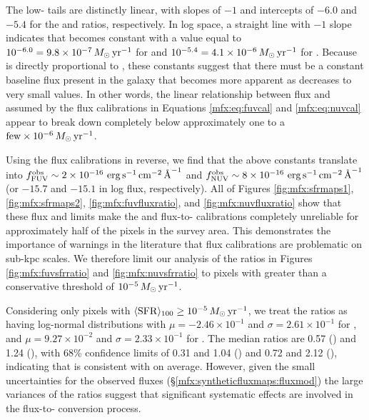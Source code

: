\documentclass[iop, tighten]{emulateapj}
\begin{document}
The low-\sfr{} tails are distinctly linear, with slopes of $-1$ and intercepts
of $-6.0$ and $-5.4$ for the \fuv{} and \nuv{} \sfr{} ratios, respectively. In
log space, a straight line with $-1$ slope indicates that \sfrx{} becomes
constant with a value equal to $10^{-6.0} = 9.8\times 10^{-7}\,M_\odot\,\mathrm{yr}^{-1}$ for
\fuv{} and $10^{-5.4} = 4.1\times 10^{-6}\,M_\odot\,\mathrm{yr}^{-1}$ for \nuv{}. Because
\sfrx{} is directly proportional to \fxobs{}, these \sfr{} constants suggest
that there must be a constant baseline flux present in the galaxy that becomes
more apparent as \sfroneh{} decreases to very small values. In other words, the
linear relationship between flux and \sfr{} assumed by the flux calibrations in
Equations \ref{mfx:eq:fuvcal} and \ref{mfx:eq:nuvcal} appear to break down
completely below \sfroneh{} approximately one to a $\mathrm{few} \times
10^{-6}\,M_\odot\,\mathrm{yr}^{-1}$.

Using the flux calibrations in reverse, we find that the above \sfr{} constants
translate into $f_{\mathrm{FUV}}^{\mathrm{obs}} \sim 2\times 10^{-16}\, \,\mathrm{erg}\,\mathrm{s}^{-1}\,\mathrm{cm}^{-2}\,\textrm{\AA}^{-1}$ and $f_{\mathrm{NUV}}^{\mathrm{obs}} \sim
8\times 10^{-16}\, \,\mathrm{erg}\,\mathrm{s}^{-1}\,\mathrm{cm}^{-2}\,\textrm{\AA}^{-1}$ (or $-15.7$ and $-15.1$ in log flux, respectively).
All of Figures  \ref{fig:mfx:sfrmaps1}, \ref{fig:mfx:sfrmaps2},
\ref{fig:mfx:fuvfluxratio}, and \ref{fig:mfx:nuvfluxratio} show that these flux
and \sfr{} limits make the \fuv{} and \nuv{} flux-to-\sfr{} calibrations
completely unreliable for approximately half of the pixels in the survey area.
This demonstrates the importance of warnings in the literature
\citep[e.g.,][]{Murphy:2011,Kennicutt:2012,Leroy:2012} that flux calibrations
are problematic on sub-kpc scales. We therefore limit our analysis of the
\sfr{} ratios in Figures \ref{fig:mfx:fuvsfrratio} and
\ref{fig:mfx:nuvsfrratio} to pixels with \sfroneh{} greater than a conservative
threshold of $10^{-5}\,M_\odot\,\mathrm{yr}^{-1}$.

Considering only pixels with $\langle\mathrm{SFR}\rangle_{100} \ge 10^{-5}\,M_\odot\,\mathrm{yr}^{-1}$, we treat the
\sfr{} ratios as having log-normal distributions with $\mu = -2.46\times
10^{-1}$ and $\sigma = 2.61\times 10^{-1}$ for \fuv{}, and $\mu = 9.27\times
10^{-2}$ and $\sigma = 2.33\times 10^{-1}$ for \nuv{}. The median ratios are
0.57 (\fuv{}) and 1.24 (\nuv{}), with 68\% confidence limits of 0.31 and 1.04
(\fuv{}) and 0.72 and 2.12 (\nuv{}), indicating that \sfrx{} is consistent with
\sfroneh{} on average. However, given the small uncertainties for the observed
fluxes (\S \ref{mfx:syntheticfluxmaps:fluxmod}) the large variances of the
\sfr{} ratios suggest that significant systematic effects are involved in the
flux-to-\sfr{} conversion process.
\end{document}
